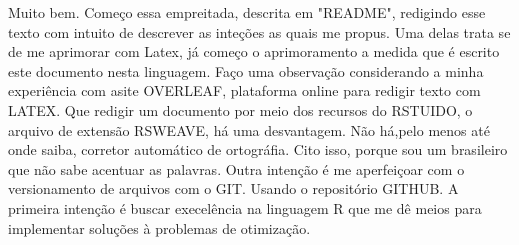 \documentclass{article}
\begin{document}


Muito bem. Começo essa empreitada, descrita em "README", redigindo esse texto com intuito de descrever as inteções as quais me propus. Uma delas trata se de me aprimorar com Latex, já começo o aprimoramento a medida que é escrito este documento nesta linguagem. Faço uma observação considerando a minha experiência com asite OVERLEAF, plataforma online para redigir texto com LATEX. Que redigir um documento por meio dos recursos do RSTUIDO, o arquivo de extensão RSWEAVE, há uma desvantagem. Não há,pelo menos até onde saiba, corretor automático de ortográfia. Cito isso, porque sou um brasileiro que não sabe acentuar as palavras.
Outra intenção é me aperfeiçoar com o versionamento de arquivos com o GIT. Usando o repositório GITHUB. 
A primeira intenção é buscar execelência na linguagem R que me dê meios para implementar soluções à problemas de otimização.
\end{document}

